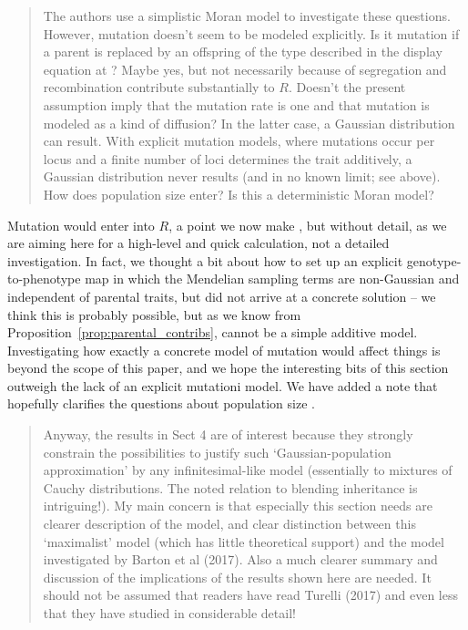 \begin{quote}
The authors use a simplistic Moran model to investigate these questions. However, mutation 
doesn’t seem to be modeled explicitly. Is it mutation if a parent is replaced by an
offspring of the type described in the display equation at ?
Maybe yes, but not necessarily because of segregation and recombination contribute substantially to $R$.
Doesn’t the present assumption imply that the mutation rate is one and that mutation is modeled as a
kind of diffusion? In the latter case, a Gaussian distribution can result. With explicit
mutation models, where mutations occur per locus and a finite number of loci determines the
trait additively, a Gaussian distribution never results (and in no known limit; see above).
How does population size enter? Is this a deterministic Moran model?
\end{quote}

Mutation would enter into $R$, a point we now make ,
but without detail, as we are aiming here for a high-level and quick calculation,
not a detailed investigation.
In fact, we thought a bit about how to set up an explicit genotype-to-phenotype map
in which the Mendelian sampling terms are non-Gaussian and independent of parental traits,
but did not arrive at a concrete solution --
we think this is probably possible,
but as we know from Proposition~\ref{prop:parental_contribs},
cannot be a simple additive model.
Investigating how exactly a concrete model of mutation would affect things is beyond the scope of this paper,
and we hope the interesting bits of this section
outweigh the lack of an explicit mutationi model.
We have added a note that hopefully clarifies the questions
about population size .

\begin{quote}
Anyway, the results
in Sect 4 are of interest because they strongly constrain the possibilities to justify such
‘Gaussian-population approximation’ by any infinitesimal-like model (essentially to
mixtures of Cauchy distributions. The noted relation to blending inheritance is intriguing!).
My main concern is that especially this section needs are clearer description of the model,
and clear distinction between this ‘maximalist’ model (which has little theoretical
support) and the model investigated by Barton et al (2017). Also a much clearer summary
and discussion of the implications of the results shown here are needed. It should not be
assumed that readers have read Turelli (2017) and even less that they have studied
\citet{barton2017infinitesimal} in considerable detail!
\end{quote}

